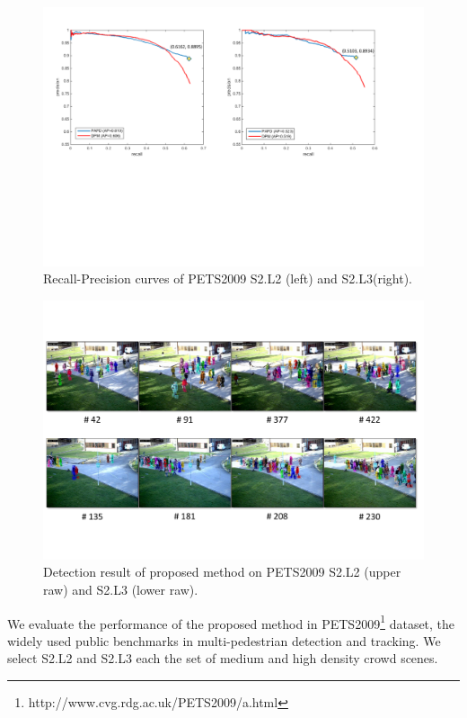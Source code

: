 \documentclass[10pt,twocolumn,letterpaper]{article}
\begin{document}
\label{sec:experiments}
\begin{figure}[t]
   \includegraphics[width=1.0\textwidth]{../figures/ROC.pdf}
   \caption{Recall-Precision curves of PETS2009 S2.L2 (left) and S2.L3(right).}
   \label{fig:exp_roc}
\end{figure}
\begin{figure}
   \includegraphics[width=1.0\textwidth]{../figures/experimental_result.pdf}
   \caption{Detection result of proposed method on PETS2009 S2.L2 (upper raw) and S2.L3 (lower raw).}
   \label{fig:exp_scenes}
\end{figure}
We evaluate the performance of the proposed method in PETS2009\footnote{http://www.cvg.rdg.ac.uk/PETS2009/a.html} dataset, the widely used public benchmarks in multi-pedestrian detection and tracking.
We select S2.L2 and S2.L3 each the set of medium and high density crowd scenes.
\end{document}
